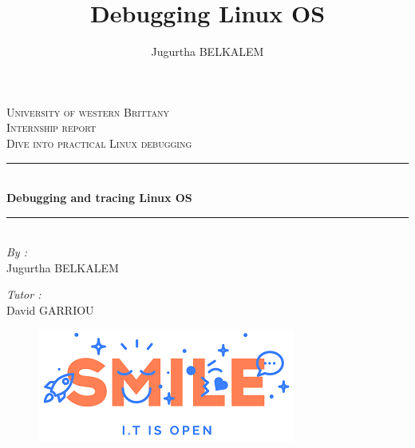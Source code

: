 \documentclass[12pt,oneside]{article}
\author{Jugurtha BELKALEM}
\title{Debugging Linux OS \\ \vspace{20px} }
\begin{document}
\begin{titlepage}

\newcommand{\HRule}{\rule{\linewidth}{0.5mm}} %

\center %
 

\textsc{\LARGE University of western Brittany}\\[1.5cm] %
\textsc{\Large Internship report}\\[0.5cm] %
\textsc{\large Dive into practical Linux debugging}\\[0.5cm] %


\HRule \\[0.4cm]
{ \huge \bfseries Debugging and tracing Linux OS}\\[0.4cm] %
\HRule \\[1.5cm]
 
\Large \emph{By :}\\
Jugurtha \textsc{BELKALEM}\\[3cm] %

\begin{minipage}{0.4\textwidth}
\begin{flushleft} \large


\emph{Tutor :}\\
David \textsc{GARRIOU} %
\begin{figure}[H]
        			\includegraphics[scale=0.55]{img/smile.png}
   			 \end{figure}


\end{flushleft}
\end{minipage}
\end{titlepage}
\end{document}

